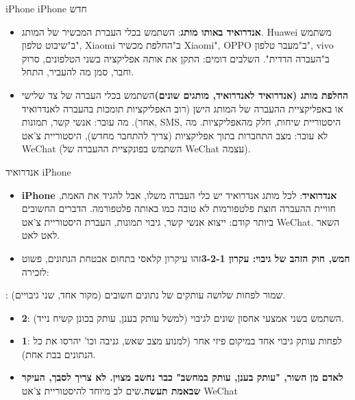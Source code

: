 
iPhone iPhone חדש


\begin{itemize}
  \item \textbf{אנדרואיד באותו מותג}: השתמש בכלי העברת המכשיר של המותג. Huawei משתמש ב"שיבוט טלפון", Xiaomi ב"החלפת מכשיר Xiaomi", OPPO ב"מעבר טלפון", vivo ב"העברה הדדית". השלבים דומים: התקן את אותה אפליקציה בשני הטלפונים, סרוק וחבר, סמן מה להעביר, התחל.
  \item \textbf{החלפת מותג (אנדרואיד לאנדרואיד, מותגים שונים)}השתמש בכלי העברה של צד שלישי או באפליקציית ההעברה של המותג הישן (רוב האפליקציות תומכות בהעברה לאנדרואיד אחר). מה עובר: אנשי קשר, תמונות, SMS, היסטוריית שיחות, חלק מהאפליקציות. מה לא עובר: מצב התחברות בתוך אפליקציות (צריך להתחבר מחדש), היסטוריית צ'אט WeChat (השתמש בפונקציית ההעברה של WeChat עצמה).
\end{itemize}


אנדרואיד iPhone


\begin{itemize}
  \item \textbf{iPhone אנדרואיד}: לכל מותג אנדרואיד יש כלי העברה משלו, אבל להגיד את האמת, חוויית ההעברה חוצת פלטפורמות לא טובה כמו באותה פלטפורמה. הדברים החשובים ביותר קודם: ייצוא אנשי קשר, גיבוי תמונות, העברת היסטוריית צ'אט WeChat. השאר לאט לאט.
  \item \textbf{חמש, חוק הזהב של גיבוי: עקרון 3-2-1}זהו עיקרון קלאסי בתחום אבטחת הנתונים, פשוט לזכירה:
\end{itemize}


: שמור לפחות שלושה עותקים של נתונים חשובים (מקור אחד, שני גיבויים).

\begin{itemize}
  \item \textbf{2}: השתמש בשני אמצעי אחסון שונים לגיבוי (למשל עותק בענן, עותק בכונן קשיח נייד).
  \item \textbf{1}: לפחות עותק גיבוי אחד במיקום פיזי אחר (למנוע מצב שאש, גניבה וכו' יהרסו את כל הנתונים בבת אחת).
  \item \textbf{לאדם מן השור, "עותק בענן, עותק במחשב" כבר נחשב מצוין. לא צריך לסבך, העיקר שבאמת תעשה.}שים לב מיוחד להיסטוריית צ'אט WeChat
\end{itemize}


